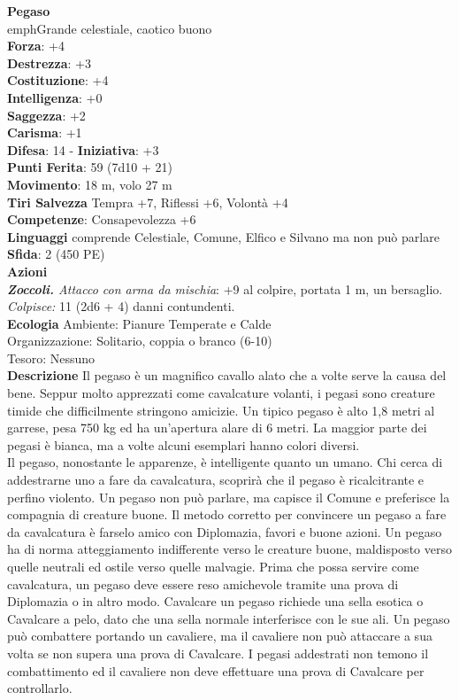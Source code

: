 \begin{multicols}{2}
\medskip\textbf{Pegaso}\\
emph{Grande celestiale, caotico buono}\\
\textbf{Forza}: +4\\
\textbf{Destrezza}: +3\\
\textbf{Costituzione}: +4\\
\textbf{Intelligenza}: +0\\
\textbf{Saggezza}: +2\\
\textbf{Carisma}: +1\\
\textbf{Difesa}: 14 - \textbf{Iniziativa}: +3\\
\textbf{Punti Ferita}: 59 (7d10 + 21)\\
\textbf{Movimento}: 18 m, volo 27 m\\
\textbf{Tiri Salvezza} Tempra +7, Riflessi +6, Volontà +4\\
\textbf{Competenze}: Consapevolezza +6\\
\textbf{Linguaggi} comprende Celestiale, Comune, Elfico e Silvano ma non può parlare\\
\textbf{Sfida}: 2 (450 PE)\smallskip\\
\smallskip\textbf{Azioni}\\
\emph{\textbf{Zoccoli.} Attacco con arma da mischia}: +9 al colpire, portata 1 m, un bersaglio.\\
\emph{Colpisce:} 11 (2d6 + 4) danni contundenti.\\
\textbf{Ecologia}
Ambiente: Pianure Temperate e Calde\\
Organizzazione: Solitario, coppia o branco (6-10)\\
Tesoro: Nessuno\\
\textbf{Descrizione}
Il pegaso è un magnifico cavallo alato che a volte serve la causa del bene. Seppur molto apprezzati come cavalcature volanti, i pegasi sono creature timide che difficilmente stringono amicizie. Un tipico pegaso è alto 1,8 metri al garrese, pesa 750 kg ed ha un'apertura alare di 6 metri. La maggior parte dei pegasi è bianca, ma a volte alcuni esemplari hanno colori diversi.\\

Il pegaso, nonostante le apparenze, è intelligente quanto un umano. Chi cerca di addestrarne uno a fare da cavalcatura, scoprirà che il pegaso è ricalcitrante e perfino violento. Un pegaso non può parlare, ma capisce il Comune e preferisce la compagnia di creature buone. Il metodo corretto per convincere un pegaso a fare da cavalcatura è farselo amico con Diplomazia, favori e buone azioni. Un pegaso ha di norma atteggiamento indifferente verso le creature buone, maldisposto verso quelle neutrali ed ostile verso quelle malvagie. Prima che possa servire come cavalcatura, un pegaso deve essere reso amichevole tramite una prova di Diplomazia o in altro modo. Cavalcare un pegaso richiede una sella esotica o Cavalcare a pelo, dato che una sella normale interferisce con le sue ali. Un pegaso può combattere portando un cavaliere, ma il cavaliere non può attaccare a sua volta se non supera una prova di Cavalcare. I pegasi addestrati non temono il combattimento ed il cavaliere non deve effettuare una prova di Cavalcare per controllarlo.\\


\end{multicols}
